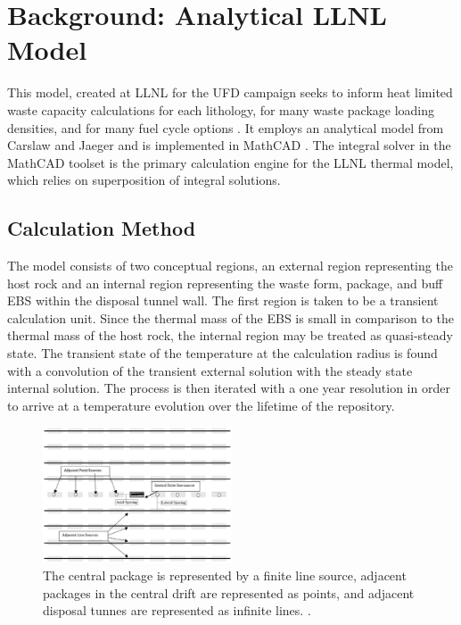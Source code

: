 \documentclass{anstrans}
\begin{document}
\section{Background: Analytical LLNL Model}

This model, created at \gls{LLNL} for the \gls{UFD} campaign seeks to inform 
heat limited waste capacity calculations for each lithology, for many waste 
package loading densities, and for many fuel cycle options 
\cite{hardin_generic_2011, sutton_investigations_2011, 
greenberg_application_2012}. It employs an analytical model from Carslaw and 
Jaeger and is implemented in MathCAD \cite{carslaw_conduction_1959, 
ptc_mathcad_2010}.  The integral solver in the MathCAD toolset is the primary 
calculation engine for the LLNL thermal model, which relies on superposition of 
integral solutions.  

\subsection{Calculation Method}

The model consists of two conceptual regions, an external region representing 
the host rock and an internal region representing the waste form, package, and 
buff \gls{EBS} within the disposal tunnel wall. The first region is taken to be  
a transient calculation unit.  Since the thermal mass of the \gls{EBS} is small 
in comparison to the thermal mass of the host rock, the internal region may be 
treated as quasi-steady state. The transient state of the temperature at the 
calculation radius is found with a convolution of the transient external 
solution with the steady state internal solution.  The process is then iterated 
with a one year resolution in order to arrive at a temperature evolution over 
the lifetime of the repository. 

\begin{figure}[h!]
  \begin{center}
    \includegraphics[width=0.5\textwidth]{llnlConcept.eps}
  \end{center}
  \caption{The central package is represented by a finite line source, adjacent 
  packages in the central drift are represented as points, and adjacent disposal 
  tunnes are represented as infinite lines.
  \cite{sutton_investigations_2011}.}
  \label{fig:llnl}
\end{figure}
\end{document}
